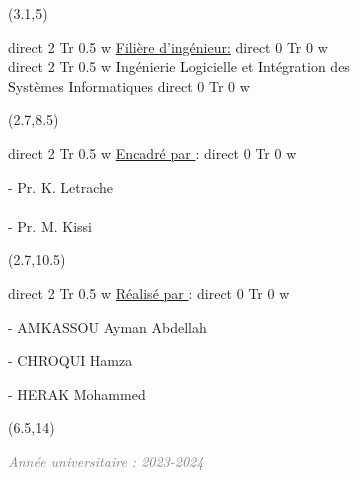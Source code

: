 \documentclass{report}
\newcommand{\textBF}[1]{%
    \pdfliteral direct {2 Tr 0.5 w} %
     #1%
    \pdfliteral direct {0 Tr 0 w}%
}
\begin{document}
\begin{textblock}{10}(3.1,5)
    \begin{center}
    \begin{Huge}
        \color{bluetext}
        \textBF{\underline{Filière \underline{d'ingénieur}:}} \\
        \vspace{5mm} 
        \textBF{\textcolor{black}{I}ngénierie \textcolor{black}{L}ogicielle et \textcolor{black}{I}ntégration des\\\textcolor{black}{S}ystèmes \textcolor{black}{I}nformatiques}
    \end{Huge}
    \end{center}
\end{textblock}

\begin{textblock}{10}(2.7,8.5)
    \begin{Huge}
        \textBF{\textcolor{bluetext}{\underline{Encadré par }:}}
        
        \vspace{0.7cm}
        {\Large{- Pr. K. Letrache \\  }}
        \\
        {\Large{\hspace*{0.55cm}- Pr. M. Kissi}}
    \end{Huge}
\end{textblock}

\begin{textblock}{10}(2.7,10.5)
    \begin{Huge}
        \textBF{\textcolor{bluetext}{\underline{Réalisé par }:}}
        
        \vspace{0.7cm}
        \Large{- AMKASSOU Ayman Abdellah}
        
        \vspace{0.4cm}
        \Large{- CHROQUI Hamza}

        \vspace{0.7cm}
        \Large{- HERAK Mohammed}
    \end{Huge}
\end{textblock}

\begin{textblock}{10}(6.5,14)
    \begin{Large}
        \emph{\textcolor{gray}{Année universitaire : 2023-2024 }}
    \end{Large}
\end{textblock}
\end{document}

